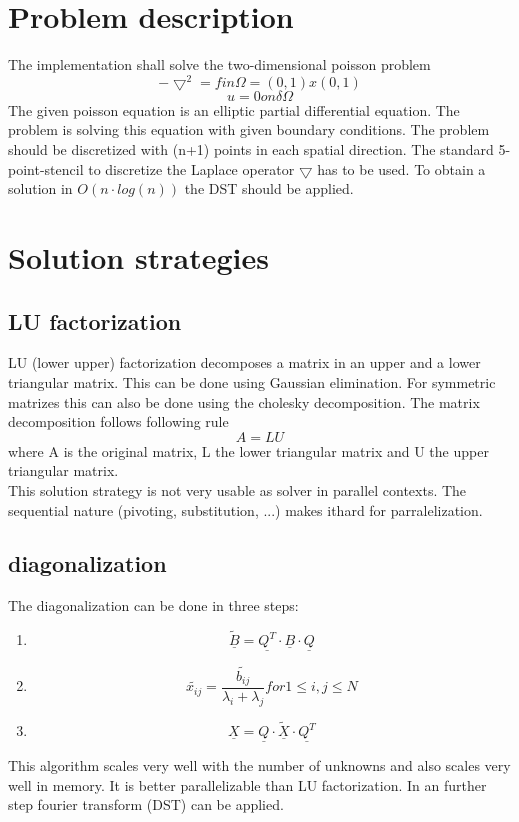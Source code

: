 \documentclass{article}
\begin{document}
\section{Problem description}
The implementation shall solve the two-dimensional poisson problem 
\begin{equation}
-\bigtriangledown^2=f in \Omega = (0,1)x(0,1)
\end{equation}
\begin{equation}
u = 0 on \delta\Omega
\end{equation}
The given poisson equation is an elliptic partial differential equation. The problem is solving this equation with given boundary conditions. 
The problem should be discretized with (n+1) points in each spatial direction. The standard 5-point-stencil to discretize the Laplace operator $\bigtriangledown$ has to be used. To obtain a solution in $O(n\cdot log(n))$ the DST should be applied.
\section{Solution strategies}
\subsection{LU factorization}
LU (lower upper) factorization decomposes a matrix in an upper and a lower triangular matrix. This can be done using Gaussian elimination. For symmetric matrizes this can also be done using the cholesky decomposition. The matrix decomposition follows following rule
\begin{equation}
A=LU
\end{equation}
where A is the original matrix, L the lower triangular matrix and U the upper triangular matrix.\\
This solution strategy is not very usable as solver in parallel contexts. The sequential nature (pivoting, substitution, ...) makes ithard for parralelization.

\subsection{diagonalization}
The diagonalization can be done in three steps:
\begin{enumerate}
\item $$\underline{\tilde{B}}=\underline{Q^T}\cdot\underline{B}\cdot\underline{Q}$$
\item $$\tilde{x_{ij}}=\frac{\tilde{b_{ij}}}{\lambda_i+\lambda_j} for 1\leq i,j \leq N$$
\item $$\underline{X}=\underline{Q}\cdot\underline{\tilde{X}}\cdot\underline{Q^T}$$
\end{enumerate}
This algorithm scales very well with the number of unknowns and also scales very well in memory. It is better parallelizable than LU factorization. In an further step fourier transform (DST) can be applied.
\end{document}
